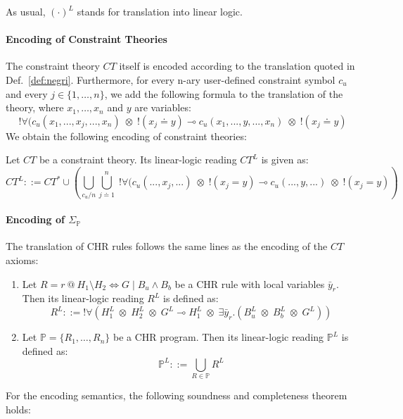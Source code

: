 \documentclass[acmtocl]{acmtrans2m}
\newcommand{\bbP}{\ensuremath{\mathbb{P}}}
\newcommand{\Sp}{\ensuremath{\Sigma_\mathbb{P}}}
\newcommand{\by}{\bar{y}}
\newcommand\inintv[2]{\ensuremath{#1\in\{1,\ldots,#2\}}}
\newcommand{\x}{{\;\otimes\;}}
\newcommand{\bang}{\; !}
\begin{document}
As usual, $(\cdot)^L$
stands for translation into linear logic.

\paragraph*{Encoding of Constraint Theories}
The constraint theory $CT$ itself is encoded according to the translation quoted
in Def.~\ref{def:negri}. Furthermore, for every n-ary
user-defined constraint symbol $c_u$ and every $\inintv{j}{n}$, we add the
following formula to the translation of the theory, where $x_1,\ldots,x_n$ and
$y$ are variables:
\[
!\forall(c_u(x_1,...,x_j,...,x_n) \x !(x_j\doteq y)
\multimap c_u(x_1,...,y,...,x_n) \x !(x_j\doteq y)
\]
We obtain the following encoding of constraint theories:
\begin{definition}[($CT^L$)]
\label{def:ct-l}
Let $CT$ be a constraint theory. Its linear-logic reading $CT^L$ is given
as:
\[
CT^L ::=
CT^* \cup
\left(
\bigcup_{c_u/n}\bigcup_{j\doteq 1}^n
\bang\forall(c_u(...,x_j,...) \x !(x_j= y)
\multimap c_u(...,y,...) \x !(x_j= y)
\right)
\]
\end{definition}
\paragraph*{Encoding of $\Sp$} The translation of CHR rules follows the same
lines as the encoding of the $CT$ axioms:
\begin{definition}[($R^L,\bbP^L$)]
\label{def:rp-l}
\begin{enumerate}
\item \label{def:rp-l:r-l} Let $R = r\ @\ H_1\setminus H_2\Leftrightarrow G\mid B_u \wedge
B_b$ be a CHR rule with local variables $\by_r$. Then its linear-logic reading $R^L$ is defined as:
\[
R^L ::= !\forall(H_1^L\x H_2^L\x G^L \multimap
H_1^L\x \exists\by_r.(B_u^L\x B_b^L\x G^L))
\]
\item \label{def:rp-l:p-l} Let $\bbP = \{R_1,\ldots,R_n\}$ be a CHR program. Then
its linear-logic
reading $\bbP^L$ is defined as:
\[
\bbP^L ::= \bigcup_{R\in \bbP} R^L
\]
\end{enumerate}
\end{definition}

For the encoding semantics, the following soundness and completeness theorem
holds:
\end{document}
